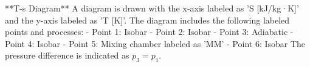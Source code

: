 **T-s Diagram**  
A diagram is drawn with the x-axis labeled as 'S [kJ/kg·K]' and the y-axis labeled as 'T [K]'.  
The diagram includes the following labeled points and processes:  
- Point 1: Isobar  
- Point 2: Isobar  
- Point 3: Adiabatic  
- Point 4: Isobar  
- Point 5: Mixing chamber labeled as 'MM'  
- Point 6: Isobar  
The pressure difference is indicated as \( p_3 = p_1 \).